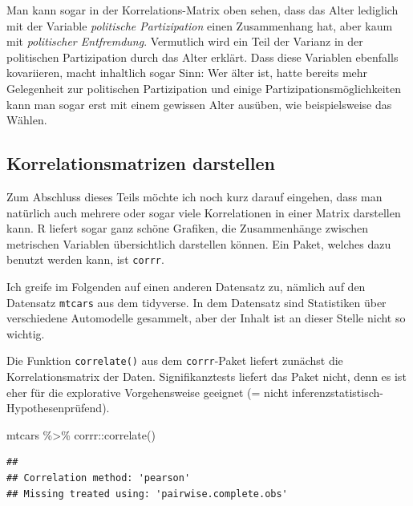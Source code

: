 \documentclass[
]{book}
\newenvironment{Shaded}{\begin{snugshade}}{\end{snugshade}}
\newcommand{\FunctionTok}[1]{\textcolor[rgb]{0.00,0.00,0.00}{#1}}
\newcommand{\NormalTok}[1]{#1}
\newcommand{\SpecialCharTok}[1]{\textcolor[rgb]{0.00,0.00,0.00}{#1}}
\begin{document}
Man kann sogar in der Korrelations-Matrix oben sehen, dass das Alter lediglich mit der Variable \emph{politische Partizipation} einen Zusammenhang hat, aber kaum mit \emph{politischer Entfremdung}. Vermutlich wird ein Teil der Varianz in der politischen Partizipation durch das Alter erklärt. Dass diese Variablen ebenfalls kovariieren, macht inhaltlich sogar Sinn: Wer älter ist, hatte bereits mehr Gelegenheit zur politischen Partizipation und einige Partizipationsmöglichkeiten kann man sogar erst mit einem gewissen Alter ausüben, wie beispielsweise das Wählen.

\hypertarget{korrelationsmatrizen-darstellen}{%
\subsection{Korrelationsmatrizen darstellen}\label{korrelationsmatrizen-darstellen}}

Zum Abschluss dieses Teils möchte ich noch kurz darauf eingehen, dass man natürlich auch mehrere oder sogar viele Korrelationen in einer Matrix darstellen kann. R liefert sogar ganz schöne Grafiken, die Zusammenhänge zwischen metrischen Variablen übersichtlich darstellen können. Ein Paket, welches dazu benutzt werden kann, ist \texttt{corrr}.

Ich greife im Folgenden auf einen anderen Datensatz zu, nämlich auf den Datensatz \texttt{mtcars} aus dem tidyverse. In dem Datensatz sind Statistiken über verschiedene Automodelle gesammelt, aber der Inhalt ist an dieser Stelle nicht so wichtig.

Die Funktion \texttt{correlate()} aus dem \texttt{corrr}-Paket liefert zunächst die Korrelationsmatrix der Daten. Signifikanztests liefert das Paket nicht, denn es ist eher für die explorative Vorgehensweise geeignet (= nicht inferenzstatistisch-Hypothesenprüfend).

\begin{Shaded}
\begin{Highlighting}[]
\NormalTok{mtcars }\SpecialCharTok{\%\textgreater{}\%} 
\NormalTok{  corrr}\SpecialCharTok{::}\FunctionTok{correlate}\NormalTok{() }
\end{Highlighting}
\end{Shaded}

\begin{verbatim}
## 
## Correlation method: 'pearson'
## Missing treated using: 'pairwise.complete.obs'
\end{verbatim}
\end{document}
